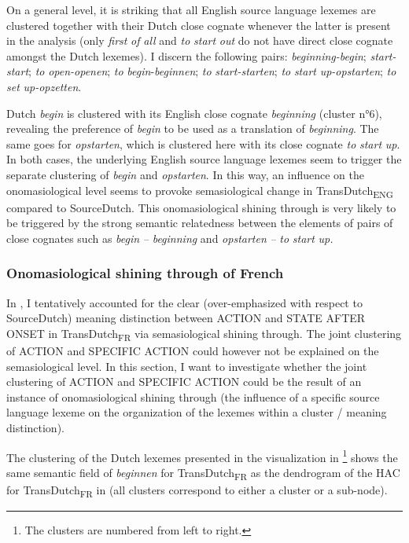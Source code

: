 On a general level, it is striking that all English source language lexemes are clustered together with their Dutch close cognate whenever the latter is present in the analysis (only \textit{first} \textit{of} \textit{all} and \textit{to} \textit{start} \textit{out} do not have direct close cognate amongst the Dutch lexemes). I discern the following pairs: \textit{beginning-begin}; \textit{start-start}; \textit{to} \textit{open-openen}; \textit{to} \textit{begin}{}-\textit{beginnen}; \textit{to} \textit{start-starten}; \textit{to} \textit{start} \textit{up-opstarten}; \textit{to} \textit{set} \textit{up-opzetten}.

Dutch \textit{begin} is clustered with its English close cognate \textit{beginning} (cluster n°6), revealing the preference of \textit{begin} to be used as a translation of \textit{beginning}. The same goes for \textit{opstarten}, which is clustered here with its close cognate \textit{to} \textit{start} \textit{up}. In both cases, the underlying English source language lexemes seem to trigger the separate clustering of \textit{begin} and \textit{opstarten}. In this way, an influence on the onomasiological level seems to provoke semasiological change in TransDutch\textsubscript{ENG} compared to SourceDutch. This onomasiological shining through is very likely to be triggered by the strong semantic relatedness between the elements of pairs of close cognates such as \textit{begin} \textit{–} \textit{beginning} and \textit{opstarten} \textit{–} \textit{to} \textit{start} \textit{up.}

\subsubsection{Onomasiological shining through of French}
\label{sec:4.6.2.2}  
In , I tentatively accounted for the clear (over-emphasized with respect to SourceDutch) meaning distinction between ACTION and STATE AFTER ONSET in TransDutch\textsubscript{FR} via semasiological shining through. The joint clustering of ACTION and {SPECIFIC} ACTION could however not be explained on the semasiological level. In this section, I want to investigate whether the joint clustering of ACTION and {SPECIFIC} ACTION could be the result of an instance of onomasiological shining through (the influence of a specific source language lexeme on the organization of the lexemes within a cluster / meaning distinction).

The clustering of the Dutch lexemes presented in the visualization in \footnote{The clusters are numbered from left to right.} shows the same semantic field of \textit{beginnen} for TransDutch\textsubscript{FR} as the dendrogram of the HAC for TransDutch\textsubscript{FR} in  (all clusters correspond to either a cluster or a sub-node).

